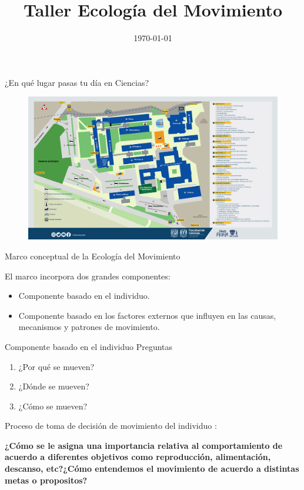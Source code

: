 \documentclass[11pt]{beamer}
\title{Taller Ecología del Movimiento}
\date{\today}
\begin{document}
\begin{frame}
\titlepage
\end{frame}


\begin{frame}{¿En qué lugar pasas tu día en Ciencias?}
	\begin{figure}
		\includegraphics[scale=0.28]{images/MAPA_Fac_2021.jpg}
	\end{figure}
\end{frame}


\begin{frame}{Marco conceptual de la Ecología del Movimiento \cite{nathan2008movement}}

El marco incorpora dos grandes componentes: 
	\begin{itemize}
		\item Componente basado en el individuo.
		\item Componente basado en los factores externos que influyen en las causas, mecanismos y patrones de movimiento.
	\end{itemize}


\end{frame}

\begin{frame}{Componente basado en el individuo}
Preguntas

	\begin{enumerate}
		\item ¿Por qué se mueven?
		\item ¿Dónde se mueven?
		\item ¿Cómo se mueven?			
	\end{enumerate}	

Proceso de toma de decisión de movimiento del individuo :			
				\begin{center}
					 \textbf{¿Cómo se le asigna una importancia relativa al comportamiento de acuerdo a diferentes objetivos como reproducción, alimentación, descanso, etc?¿Cómo entendemos el movimiento de acuerdo a distintas metas o propositos?}
				\end{center}
\end{frame}
\end{document}
